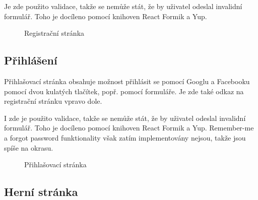 \documentclass[a4paper,oneside,12pt]{report}
\begin{document}
Je zde použito validace, takže se nemůže stát, že by uživatel odeslal invalidní formulář. Toho je docíleno pomocí knihoven React Formik a Yup.
\begin{figure}[H]
   \centering
   \caption[Registrační stránka]{Registrační stránka}
   \label{fig:architecture}
\end{figure}

\subsection{Přihlášení}
Přihlašovací stránka obsahuje možnost přihlásit se pomocí Googlu a Facebooku pomocí dvou kulatých tlačítek, popř. pomocí formuláře. Je zde také odkaz na registrační stránku vpravo dole.

I zde je použito validace, takže se nemůže stát, že by uživatel odeslal invalidní formulář. Toho je docíleno pomocí knihoven React Formik a Yup. Remember-me a forgot password funktionality však zatím implementovány nejsou, takže jsou spíše na okrasu.
\begin{figure}[H]
   \centering
   \caption[Přihlašovací stránka]{Přihlašovací stránka}
   \label{fig:architecture}
\end{figure}

\subsection{Herní stránka}
\end{document}
